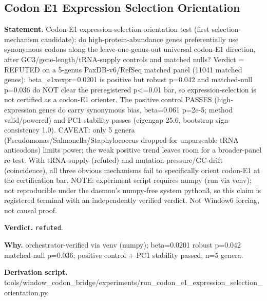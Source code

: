 \subsection{Codon E1 Expression Selection Orientation}\label{sec:bridge-codon-e1-expression-selection-orientation}
\textbf{Statement.} Codon-E1 expression-selection orientation test (first selection-mechanism candidate): do
high-protein-abundance genes preferentially use synonymous codons along the leave-one-genus-out
universal codon-E1 direction, after GC3/gene-length/tRNA-supply controls and matched nulls? Verdict
= REFUTED on a 5-genus PaxDB-v6/RefSeq matched panel (11041 matched genes): beta\_e1xexpr=0.0201 is
positive but robust p=0.042 and matched-null p=0.036 do NOT clear the preregistered p<=0.01 bar, so
expression-selection is not certified as a codon-E1 orienter. The positive control PASSES
(high-expression genes do carry synonymous bias, beta=0.061 p=2e-5; method valid/powered) and PC1
stability passes (eigengap 25.6, bootstrap sign-consistency 1.0). CAVEAT: only 5 genera
(Pseudomonas/Salmonella/Staphylococcus dropped for unparseable tRNA anticodons) limits power; the
weak positive trend leaves room for a broader-panel re-test. With tRNA-supply (refuted) and
mutation-pressure/GC-drift (coincidence), all three obvious mechanisms fail to specifically orient
codon-E1 at the certification bar. NOTE: experiment script requires numpy (run via venv); not
reproducible under the daemon's numpy-free system python3, so this claim is registered terminal with
an independently verified verdict. Not Window6 forcing, not causal proof.

\textbf{Verdict.} \texttt{refuted}.

\textbf{Why.} orchestrator-verified via venv (numpy); beta=0.0201 robust p=0.042 matched-null p=0.036; positive
control + PC1 stability passed; n=5 genera.

\textbf{Derivation script.} tools/window\_codon\_bridge/experiments/run\_codon\_e1\_expression\_selection\_orientation.py

